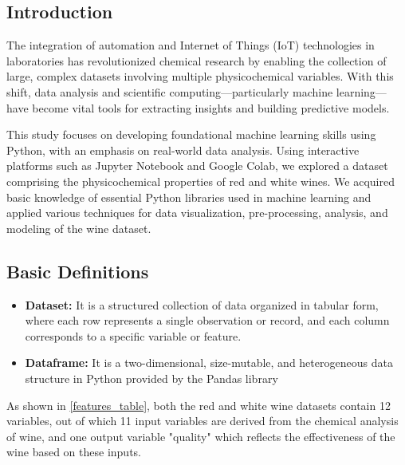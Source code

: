 \newpage
\subsection{Introduction}

The integration of automation and Internet of Things (IoT) technologies in laboratories has revolutionized chemical research by enabling the collection of large, complex datasets involving multiple physicochemical variables. With this shift, data analysis and scientific computing—particularly machine learning—have become vital tools for extracting insights and building predictive models.

This study focuses on developing foundational machine learning skills using Python, with an emphasis on real-world data analysis. Using interactive platforms such as Jupyter Notebook and Google Colab, we explored a dataset comprising the physicochemical properties of red and white wines. We acquired basic knowledge of essential Python libraries used in machine learning and applied various techniques for data visualization, pre-processing, analysis, and modeling of the wine dataset.


\subsection{Basic Definitions}
\begin{itemize}
    \item \textbf{Dataset:} It is a structured collection of data organized in tabular form, where each row represents a single observation or record, and each column corresponds to a specific variable or feature.
    \item \textbf{Dataframe:} It is a two-dimensional, size-mutable, and heterogeneous data structure in Python provided by the Pandas library
\end{itemize}




As shown in \cref{features_table}, both the red and white wine datasets contain 12 variables, out of which 11 input variables are derived from the chemical analysis of wine, and one output variable "quality" which reflects the effectiveness of the wine based on these inputs.

